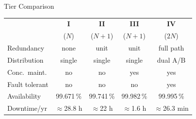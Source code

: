 \begin{frame}{Tier Comparison}
  \centering
  \begin{tabular}{lcccc}
    \toprule
      & \textbf{I} & \textbf{II} & \textbf{III} & \textbf{IV} \\
      & ($N$) & ($N{+}1$) & ($N{+}1$) & ($2N$) \\
    \midrule
    Redundancy     & none   & unit   & unit   & full path \\
    Distribution   & single & single & single & dual A/B \\
    Conc.\ maint.  & no     & no     & yes    & yes \\
    Fault tolerant & no     & no     & no     & yes \\
    Availability   & 99.671\,\% & 99.741\,\% & 99.982\,\% & 99.995\,\% \\
    Downtime/yr    & $\approx$28.8 h & $\approx$22 h & $\approx$1.6 h & $\approx$26.3 min \\
    \bottomrule
  \end{tabular}

 \end{frame}

